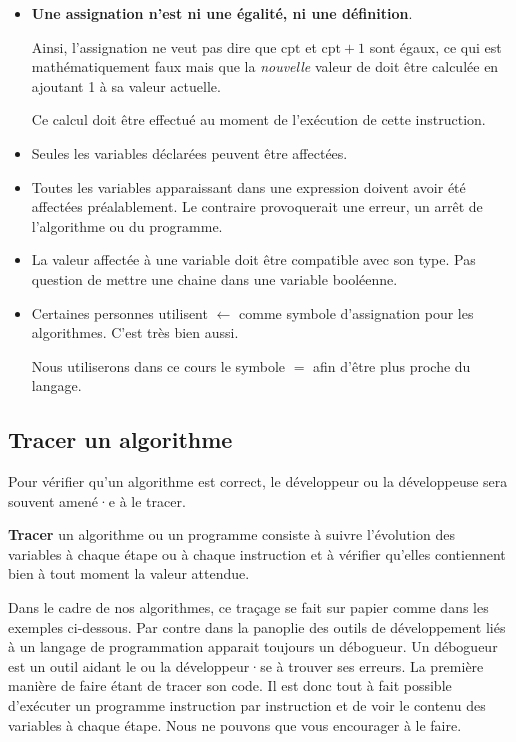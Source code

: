 				\begin{itemize}
				\item 
					\textbf{Une assignation n’est ni une égalité, 
					ni une définition}.
					
					Ainsi, l’assignation  ne veut pas dire
					que $\textrm{cpt}$ et $\textrm{cpt} + 1$ sont égaux, ce qui
					est mathématiquement faux mais que la \emph{nouvelle} valeur
					de  doit être calculée en ajoutant 1 à sa valeur
					actuelle.  
					
					Ce calcul doit être effectué au moment de l'exécution
					de cette instruction. 
				
				\item 
					Seules les variables déclarées peuvent être affectées.
				\item 
					Toutes les variables apparaissant dans une expression
					doivent avoir été affectées préalablement. 
					Le contraire provoquerait une erreur,
					un arrêt de l’algorithme ou du programme.
				\item 
					La valeur affectée à une variable 
					doit être compatible avec son type.
					Pas question de mettre une chaine dans une variable
					booléenne.
				\item 
					Certaines personnes utilisent \textbf{$\leftarrow$} comme 
					symbole d'assignation pour les algorithmes. C'est très bien 
					aussi. 

					Nous utiliserons dans ce cours le symbole $=$ afin d'être plus
					proche du langage. 
				\end{itemize}
				
		\subsection{Tracer un algorithme}
		
			Pour vérifier qu’un algorithme est correct,
			le développeur ou la développeuse sera souvent amené·e à 
			le tracer.

			\textbf{Tracer} un algorithme ou un programme consiste à suivre
			l’évolution des variables à chaque étape ou à chaque instruction
			et à vérifier qu’elles contiennent bien à tout moment la valeur
			attendue.

			Dans le cadre de nos algorithmes, ce traçage se fait sur papier
			comme dans les exemples ci-dessous. Par contre dans la panoplie des
			outils de développement liés à un langage de programmation apparait
			toujours un débogueur. Un débogueur est un outil
			aidant le ou la développeur·se à trouver ses erreurs. La première
			manière de faire étant de tracer son code. Il est donc tout à fait
			possible d'exécuter un programme instruction par instruction et de
			voir le contenu des variables à chaque étape. Nous ne pouvons que
			vous encourager à le faire. 
			
